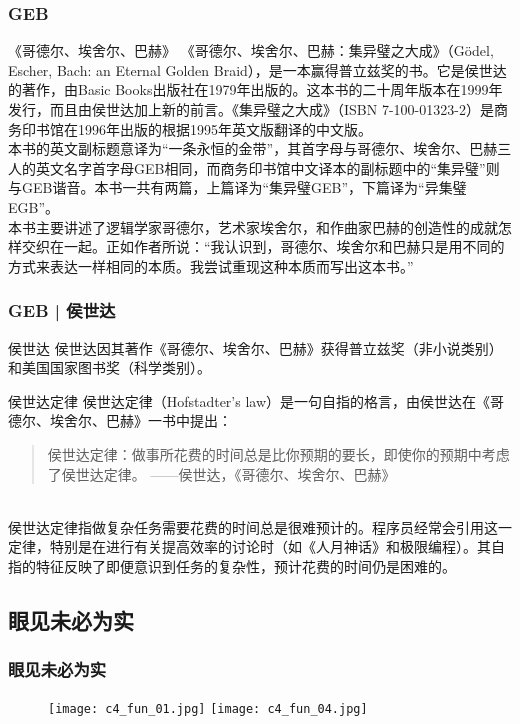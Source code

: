 \begin{frame}
  \frametitle{GEB}
  \begin{block}{《哥德尔、埃舍尔、巴赫》}
    《哥德尔、埃舍尔、巴赫：集异璧之大成》（Gödel, Escher, Bach: an Eternal Golden Braid），是一本赢得普立兹奖的书。它是侯世达的著作，由Basic Books出版社在1979年出版的。这本书的二十周年版本在1999年发行，而且由侯世达加上新的前言。《集异璧之大成》（ISBN 7-100-01323-2）是商务印书馆在1996年出版的根据1995年英文版翻译的中文版。\\
    \vspace{0.3em}
本书的英文副标题意译为“一条永恒的金带”，其首字母与哥德尔、埃舍尔、巴赫三人的英文名字首字母GEB相同，而商务印书馆中文译本的副标题中的“集异璧”则与GEB谐音。本书一共有两篇，上篇译为“集异璧GEB”，下篇译为“异集璧EGB”。 \\
    \vspace{0.3em}
本书主要讲述了逻辑学家哥德尔，艺术家埃舍尔，和作曲家巴赫的创造性的成就怎样交织在一起。正如作者所说：“我认识到，哥德尔、埃舍尔和巴赫只是用不同的方式来表达一样相同的本质。我尝试重现这种本质而写出这本书。”
  \end{block}
\end{frame}

\begin{frame}
  \frametitle{GEB | 侯世达}
  \begin{block}{侯世达}
    侯世达因其著作《哥德尔、埃舍尔、巴赫》获得普立兹奖（非小说类别）和美国国家图书奖（科学类别）。
  \end{block}
  \begin{block}{\alert{侯世达定律}}
    侯世达定律（Hofstadter's law）是一句自指的格言，由侯世达在《哥德尔、埃舍尔、巴赫》一书中提出：
    \begin{quote}
    侯世达定律：做事所花费的时间总是比你预期的要长，即使你的预期中考虑了侯世达定律。 ——侯世达，《哥德尔、埃舍尔、巴赫》
    \end{quote}
\\侯世达定律指做复杂任务需要花费的时间总是很难预计的。程序员经常会引用这一定律，特别是在进行有关提高效率的讨论时（如《人月神话》和极限编程）。其自指的特征反映了即便意识到任务的复杂性，预计花费的时间仍是困难的。
  \end{block}
\end{frame}

\subsection{眼见未必为实}
\begin{frame}
  \frametitle{眼见未必为实}
  \begin{figure}
    \centering
    \texttt{[image: c4\_fun\_01.jpg]}\quad
    \texttt{[image: c4\_fun\_04.jpg]}
  \end{figure}
\end{frame}

